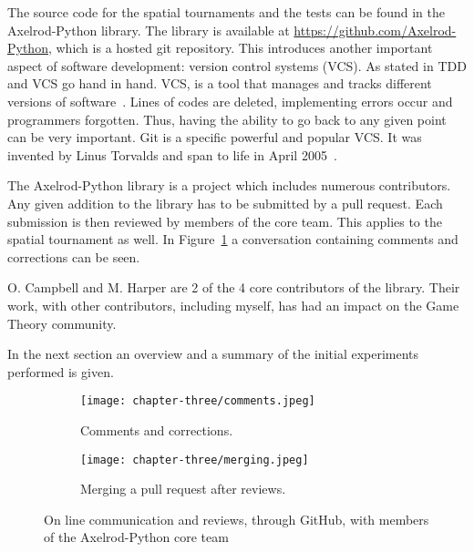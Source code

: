 The source code for the spatial tournaments and the tests can be found
in the Axelrod-Python library. The library is available at
\url{https://github.com/Axelrod-Python},
which is a hosted git repository. This introduces another important aspect
of software development: version control systems (VCS). As stated in \cite{Developer}
TDD and VCS go hand in hand. VCS, is a tool that manages and tracks different
versions of software~\cite{Vogel2014}. Lines of codes are deleted, implementing
errors occur and programmers forgotten. Thus, having the ability to go back to any
given point can be very important. Git is a specific powerful and popular VCS. It
was invented by Linus Torvalds and span to life in April 2005~\cite{Vogel2014}.

The Axelrod-Python library is a project which includes numerous contributors.
Any given addition to the
library has to be submitted by a pull request. Each submission is then
reviewed by members of the core team. This applies to the spatial tournament as well.
In Figure~\ref{fig:github} a conversation containing comments and corrections
can be seen.

O. Campbell and M. Harper are 2 of the 4 core contributors of the library.
Their work, with other contributors, including myself, has had an impact on
the Game Theory community.

In the next section an overview and a summary of the initial experiments
performed is given.

\begin{figure}[H]
	\centering
	\begin{subfigure}[H]{1\textwidth}
		\centering
		\texttt{[image: chapter-three/comments.jpeg]}
		\caption{Comments and corrections.}
	\end{subfigure}
	\hfill
	\begin{subfigure}[H]{1\textwidth}
		\centering
		\texttt{[image: chapter-three/merging.jpeg]}
		\caption{Merging a pull request after reviews.}
	\end{subfigure}
	\caption{On line communication and reviews, through GitHub,
	with members of the Axelrod-Python core team}
	\label{fig:github}
\end{figure}


